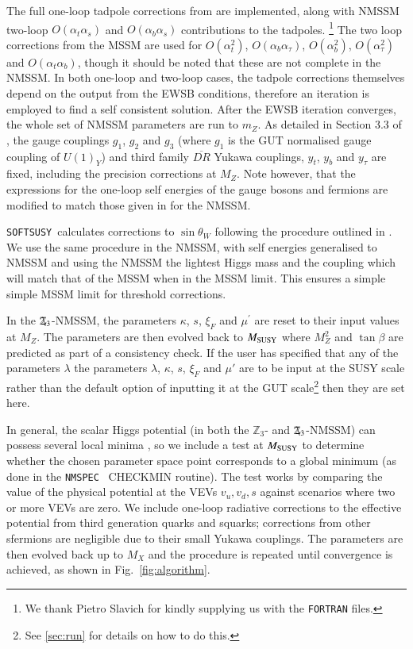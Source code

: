 \documentclass[final,3p,times,pdflatex]{elsarticle}
\def\SOFTSUSY{{\tt SOFTSUSY}}
\newcommand{\Zv}{\,\mathbf{\backslash}\mkern-11.0mu{\mathbb{Z}}_{3}} %
\def\at{\alpha_t}
\def\ab{\alpha_b}
\def\as{\alpha_s}
\def\atau{\alpha_{\tau}}
\def\oatab{O(\at\ab)}
\def\oatas{O(\at\as)}
\def\oabas{O(\ab\as)}
\def\oatq{O(\at^2)}
\def\oabq{O(\ab^2)}
\def\oatauq{O(\atau^2)}
\def\oabatau{O(\ab \atau)}
\begin{document}
The full one-loop tadpole corrections
 from \cite{Degrassi:2009yq} are implemented, along with NMSSM two-loop 
$\oatas$ and $\oabas$ contributions \cite{Degrassi:2009yq} to the tadpoles.%
\footnote{We thank Pietro Slavich for kindly supplying us with the {\tt FORTRAN}
 files.}
 The two loop corrections from the MSSM are used for $\oatq$, $\oabatau$, 
$\oabq$, $\oatauq$ and $\oatab$, though it should be noted that these are not
complete in the NMSSM.  In both one-loop and two-loop cases, the tadpole 
corrections themselves depend on the output from the EWSB conditions, therefore 
an iteration is employed to find a self consistent solution.
After the EWSB iteration converges, the whole set of NMSSM parameters are run to
 $m_Z$. As detailed in Section 3.3 of \cite{Allanach:2001kg}, the gauge 
couplings $g_1$, $g_2$ and $g_3$ (where $g_1$ is the GUT normalised gauge 
coupling of $U(1)_Y$) and third family $\overline{DR}$ Yukawa couplings, $y_t$, 
$y_b$ and $y_\tau$ are fixed, including the precision corrections at $M_Z$.  Note
 however, that the expressions for the one-loop self energies of the gauge 
bosons and fermions are modified to match those given in \cite{Degrassi:2009yq}
 for the NMSSM.

\SOFTSUSY~calculates corrections to $\sin \theta_W$ following the procedure outlined in \cite{Pierce:1997zz}.  We use the same procedure in the NMSSM, with self energies generalised to NMSSM and using the NMSSM the lightest Higgs mass and the coupling which will match that of the MSSM when in the MSSM limit.  This ensures a simple simple MSSM limit for threshold corrections. 

In the $\Zv$-NMSSM, the parameters $\kappa$, $s$, $\xi_F$ and $\mu^\prime$ are 
reset to their input values at $M_Z$.  The parameters are then evolved back to 
$M_{\rm SUSY}$ where $M_Z^2$ and $\tan\beta$ are predicted as part of a consistency 
check.  If the user has specified that any of the parameters $\lambda$ the parameters $\lambda$, $\kappa$, $s$, $\xi_F$ and $\mu'$  are to be input at the SUSY scale rather than the default option of inputting it at the GUT scale\footnote{See \ref{sec:run} for details on how to do this.} then they are set here.  

In general, the scalar Higgs potential (in both the $\mathbb{Z}_3$- and 
$\Zv$-NMSSM) can possess several local minima \cite{Ellwanger:2009dp}, so we 
include a test at $M_{\rm SUSY}$ to determine whether the chosen parameter space 
point corresponds to a global minimum (as done in the {\tt NMSPEC}~\cite{Ellwanger:2006rn} CHECKMIN
 routine).  The test works by comparing the value of the physical potential at 
the VEVs $v_u,v_d,s$ against scenarios where two or more VEVs are zero.  We 
include one-loop radiative corrections to the effective potential from third 
generation quarks and squarks; corrections from other sfermions are negligible 
due to their small Yukawa couplings.   
The parameters are then evolved back up to $M_X$ and the procedure is repeated until convergence is achieved, as shown in Fig.~\ref{fig:algorithm}. 
\end{document}
